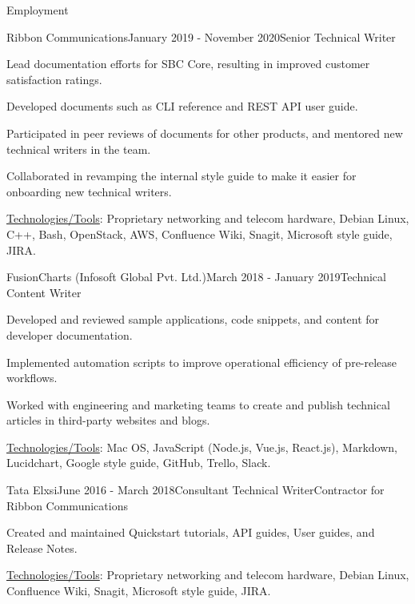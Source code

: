 \documentclass{resume} %
\begin{document}
\begin{rSection}{Employment}
\begin{rSubsection}{Ribbon Communications}{January 2019 - November 2020}{Senior Technical Writer}{}
\item Lead documentation efforts for SBC Core, resulting in improved customer satisfaction ratings.
\item Developed documents such as CLI reference and REST API user guide.
\item Participated in peer reviews of documents for other products, and mentored new technical writers in the team.
\item Collaborated in revamping the internal style guide to make it easier for onboarding new technical writers.
\item \underline{Technologies/Tools}: Proprietary networking and telecom hardware, Debian Linux, C++, Bash, OpenStack, AWS, Confluence Wiki, Snagit, Microsoft style guide, JIRA.
\end{rSubsection}



\begin{rSubsection}{FusionCharts (Infosoft Global Pvt. Ltd.)}{March 2018 - January 2019}{Technical Content Writer}{}
\item Developed and reviewed sample applications, code snippets, and content for developer documentation.
\item Implemented automation scripts to improve operational efficiency of pre-release workflows.
\item Worked with engineering and marketing teams to create and publish technical articles in third-party websites and blogs.
\item \underline{Technologies/Tools}: Mac OS, JavaScript (Node.js, Vue.js, React.js), Markdown, Lucidchart, Google style guide, GitHub, Trello, Slack.
\end{rSubsection}


\begin{rSubsection}{Tata Elxsi}{June 2016 - March 2018}{Consultant Technical Writer}{Contractor for Ribbon Communications}
\item Created and maintained Quickstart tutorials, API guides, User guides, and Release Notes.
\item \underline{Technologies/Tools}: Proprietary networking and telecom hardware, Debian Linux, Confluence Wiki, Snagit, Microsoft style guide, JIRA.
\end{rSubsection}


\end{rSection}
\end{document}
